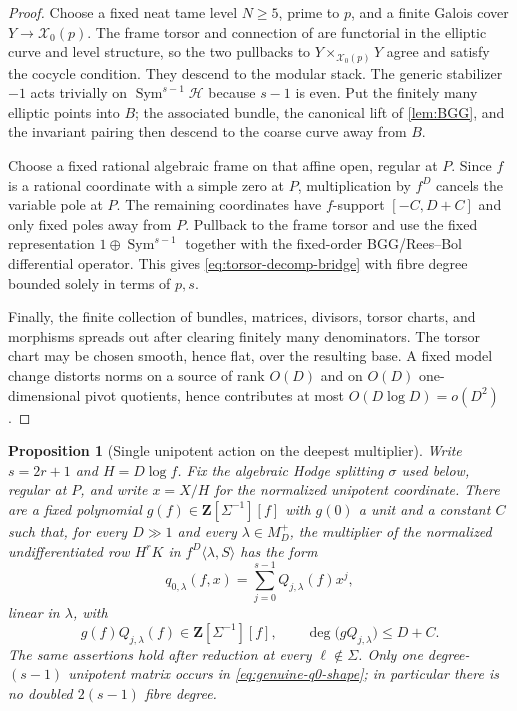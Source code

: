 \documentclass[11pt]{article}
\newtheorem{proposition}[proposition]{Proposition}
\theoremstyle{definition}
\theoremstyle{remark}
\newcommand{\Z}{\mathbf Z}
\newcommand{\Sym}{\operatorname{Sym}}
\newcommand{\calH}{\mathcal H}
\begin{document}
\begin{proof}
Choose a fixed neat tame level $N\ge5$, prime to $p$, and a finite Galois
cover $Y\to\mathscr X_0(p)$.  The frame torsor and connection of
\cite[Propositions~A.14--A.15]{GPRJ2025} are functorial in the elliptic curve
and level structure, so the two pullbacks to
$Y\times_{\mathscr X_0(p)}Y$ agree and satisfy the cocycle condition.  They
descend to the modular stack.  The generic stabilizer $-1$ acts trivially on
$\Sym^{s-1}\calH$ because $s-1$ is even.  Put the finitely many elliptic
points into $B$; the associated bundle, the canonical lift of
\cref{lem:BGG}, and the invariant pairing then descend to the coarse curve
away from $B$.

Choose a fixed rational algebraic frame on that affine open, regular at $P$.
Since $f$ is a rational coordinate with a simple zero at $P$, multiplication
by $f^D$ cancels the variable pole at $P$.  The remaining coordinates have
$f$-support $[-C,D+C]$ and only fixed poles away from $P$.  Pullback to the
frame torsor and use the fixed representation $1\oplus\Sym^{s-1}$ together
with the fixed-order BGG/Rees--Bol differential operator.  This gives
\eqref{eq:torsor-decomp-bridge} with fibre degree bounded solely in terms of
$p,s$.

Finally, the finite collection of bundles, matrices, divisors, torsor charts,
and morphisms spreads out after clearing finitely many denominators.  The
torsor chart may be chosen smooth, hence flat, over the resulting base.  A fixed model change distorts norms on a source of rank $O(D)$ and on
$O(D)$ one-dimensional pivot quotients, hence contributes at most
$O(D\log D)=o(D^2)$.
\end{proof}

\begin{proposition}[Single unipotent action on the deepest multiplier]
\label{prop:single-unipotent}
Write $s=2r+1$ and $H=D\log f$.  Fix the algebraic Hodge splitting
$\sigma$ used below, regular at $P$, and write $x=X/H$ for the normalized
unipotent coordinate.  There are a fixed
polynomial $g(f)\in\Z[\Sigma^{-1}][f]$ with $g(0)$ a unit and a constant $C$
such that, for every $D\gg1$ and every $\lambda\in M_D^+$, the multiplier of
the normalized undifferentiated row $H^rK$ in
$f^D\langle\lambda,S\rangle$ has the form
\begin{equation}\label{eq:genuine-q0-shape}
 q_{0,\lambda}(f,x)=\sum_{j=0}^{s-1}Q_{j,\lambda}(f)x^j,
\end{equation}
linear in $\lambda$, with
\begin{equation}\label{eq:genuine-q0-degree}
 g(f)Q_{j,\lambda}(f)\in\Z[\Sigma^{-1}][f],
 \qquad
 \deg\bigl(gQ_{j,\lambda}\bigr)\le D+C.
\end{equation}
The same assertions hold after reduction at every $\ell\notin\Sigma$.
Only one degree-$(s-1)$ unipotent matrix occurs in
\eqref{eq:genuine-q0-shape}; in particular there is no doubled
$2(s-1)$ fibre degree.
\end{proposition}
\end{document}
